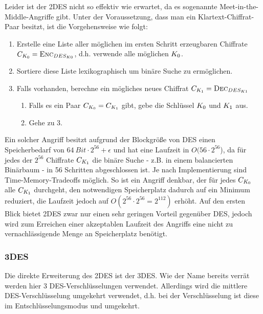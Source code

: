 Leider ist der 2DES nicht so effektiv wie erwartet, da es sogenannte Meet-in-the-Middle-Angriffe gibt. Unter der Voraussetzung, dass man ein
Klartext-Chiffrat-Paar besitzt, ist die Vorgehensweise wie folgt:
\begin{enumerate}
	\item Erstelle eine Liste aller möglichen im ersten Schritt erzeugbaren Chiffrate $C_{K_0} = \textsc{Enc}_{DES_{K 0}}$, d.h. verwende alle möglichen
	$K_0$.
	\item Sortiere diese Liste lexikographisch um binäre Suche zu ermöglichen.
	\item Falls vorhanden, berechne ein mögliches neues Chiffrat $C_{K_1}= \textsc{Dec}_{DES_{K 1}}$
	\begin{enumerate}
		\item Falls es ein Paar $C_{K_0} = C_{K_1}$ gibt, gebe die Schlüssel $K_0$ und $K_1$ aus.
		\item Gehe zu 3.
	\end{enumerate}
\end{enumerate}
Ein solcher Angriff besitzt aufgrund der Blockgröße von DES einen Speicherbedarf von $64\ Bit \cdot 2^{56} + \epsilon$ und hat eine Laufzeit in $O(56 \cdot 2^{56}$), da für jedes der $2^{56}$ Chiffrate $C_{K_1}$ die binäre Suche - z.B. in einem balancierten Binärbaum - in 56 Schritten abgeschlossen ist. Je nach Implementierung sind Time-Memory-Tradeoffs möglich. So ist ein Angriff denkbar, der für jedes $C_{K_0}$ alle $C_{K_1}$ durchgeht, den notwendigen Speicherplatz dadurch auf ein Minimum reduziert, die Laufzeit jedoch auf $O(2^{56} \cdot 2^{56} = 2^{112})$ erhöht. Auf den ersten Blick bietet 2DES zwar nur einen sehr geringen Vorteil gegenüber DES, jedoch wird zum Erreichen einer akzeptablen Laufzeit des Angriffs eine nicht zu vernachlässigende Menge an Speicherplatz benötigt.

\subsubsection{3DES}
\label{sssec:3des}
Die direkte Erweiterung des 2DES ist der 3DES. Wie der Name bereits verrät werden hier 3 DES-Verschlüsselungen verwendet. Allerdings wird die mittlere DES-Verschlüsselung umgekehrt verwendet, d.h. bei der Verschlüsselung ist diese im Entschlüsselungsmodus und umgekehrt.

